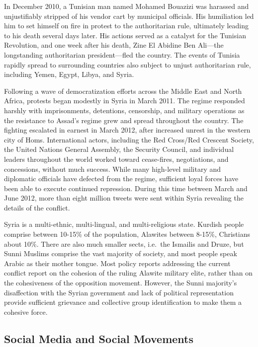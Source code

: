 \documentclass[english,man]{apa6}
\begin{document}
In December 2010, a Tunisian man named Mohamed Bouazizi was harassed and
unjustifiably stripped of his vendor cart by municipal officials. His
humiliation led him to set himself on fire in protest to the authoritarian
rule, ultimately leading to his death several days later. His actions served
as a catalyst for the Tunisian Revolution, and one week after his death,
Zine El Abidine Ben Ali---the longstanding authoritarian president---fled the
country. The events of Tunisia rapidly spread to surrounding countries
also subject to unjust authoritarian rule, including Yemen, Egypt, Libya,
and Syria.

Following a wave of democratization efforts across the Middle East and North Africa, protests began modestly in Syria in March 2011. The regime responded harshly with imprisonments, detentions, censorship, and military operations as the resistance to Assad's regime grew and spread throughout the country. The fighting escalated in earnest in March 2012, after increased unrest in the western city of Homs. International actors, including the Red Cross/Red Crescent Society, the United Nations General Assembly, the Security Council, and individual leaders throughout the world worked toward cease-fires, negotiations, and concessions, without much success. While many high-level military and diplomatic officials have defected from the regime, sufficient loyal forces have been able to execute continued repression. During this time between March and June 2012, more than eight million tweets were sent within Syria revealing the details of the conflict.

Syria is a multi-ethnic, multi-lingual, and multi-religious state. Kurdish people comprise between 10-15\% of the population, Alawites between 8-15\%, Christians about 10\%. There are also much smaller sects, i.e.~the Ismailis and Druze, but Sunni Muslims comprise the vast majority of society, and most people speak Arabic as their mother tongue. Most policy reports addressing the current conflict report on the cohesion of the ruling Alawite military elite, rather than on the cohesiveness of the opposition movement. However, the Sunni majority's disaffection with the Syrian government and lack of political representation provide sufficient grievance and collective group identification to make them a cohesive force.

\hypertarget{social-media-and-social-movements}{%
\subsection{Social Media and Social Movements}\label{social-media-and-social-movements}}
\end{document}
